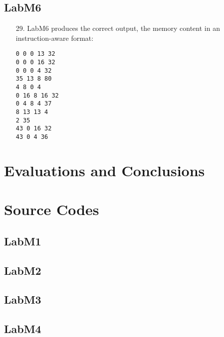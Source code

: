 \documentclass{article}
\begin{document}
\subsection{LabM6}
\begin{enumerate}
\item[29. ] LabM6 produces the correct output, the memory content in an
instruction-aware format:
\begin{verbatim}
0 0 0 13 32
0 0 0 16 32
0 0 0 4 32
35 13 8 80
4 8 0 4
0 16 8 16 32
0 4 8 4 37
8 13 13 4
2 35
43 0 16 32
43 0 4 36
\end{verbatim}
\end{enumerate}


\section{Evaluations and Conclusions}



\section{Source Codes}

\subsection{LabM1}


\subsection{LabM2}


\subsection{LabM3}


\subsection{LabM4}

\end{document}
